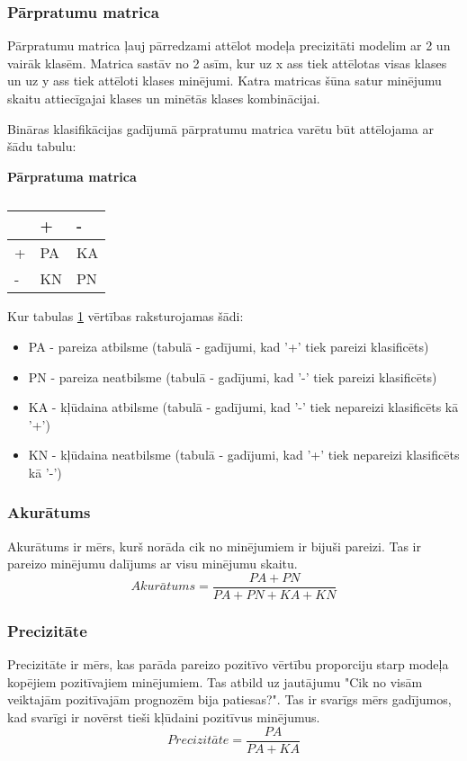 \subsubsection{Pārpratumu matrica}
Pārpratumu matrica ļauj pārredzami attēlot modeļa precizitāti modelim ar 2 un vairāk klasēm. Matrica sastāv no 2 asīm, kur uz x ass tiek attēlotas visas klases un uz y ass tiek attēloti klases minējumi. Katra matricas šūna satur minējumu skaitu attiecīgajai klases un minētās klases kombinācijai.

Bināras klasifikācijas gadījumā pārpratumu matrica varētu būt attēlojama ar šādu tabulu:
\begin{table}[H]
\centering
\caption{\label{tab:novertejums}}
\textbf{Pārpratuma matrica\\}
\begin{tabular}{|l|l|l|}
\hline
  & +  & -  \\ \hline
+ & PA & KA \\ \hline
- & KN & PN \\ \hline
\end{tabular}
\end{table}

Kur tabulas  \ref{tab:novertejums} vērtības raksturojamas šādi:
\begin{itemize}
\item PA - pareiza atbilsme (tabulā - gadījumi, kad '+' tiek pareizi klasificēts)
\item PN - pareiza neatbilsme (tabulā - gadījumi, kad '-' tiek pareizi klasificēts)
\item KA - kļūdaina atbilsme (tabulā - gadījumi, kad '-' tiek nepareizi klasificēts kā '+')
\item KN - kļūdaina neatbilsme (tabulā - gadījumi, kad '+' tiek nepareizi klasificēts kā '-')

\end{itemize}
\subsubsection{Akurātums}
Akurātums ir mērs, kurš norāda cik no minējumiem ir bijuši pareizi. Tas ir pareizo minējumu dalījums ar visu minējumu skaitu.
\begin{equation}
Akur\bar{a}tums = \frac{PA + PN}{PA + PN + KA + KN}
\end{equation}
\subsubsection{Precizitāte}
Precizitāte ir mērs, kas parāda pareizo pozitīvo vērtību proporciju starp modeļa kopējiem pozitīvajiem minējumiem. Tas atbild uz jautājumu "Cik no visām veiktajām pozitīvajām prognozēm bija patiesas?". Tas ir svarīgs mērs gadījumos, kad svarīgi ir novērst tieši kļūdaini pozitīvus minējumus.
\begin{equation}
Precizit\bar{a}te = \frac{PA}{PA + KA}
\end{equation}
